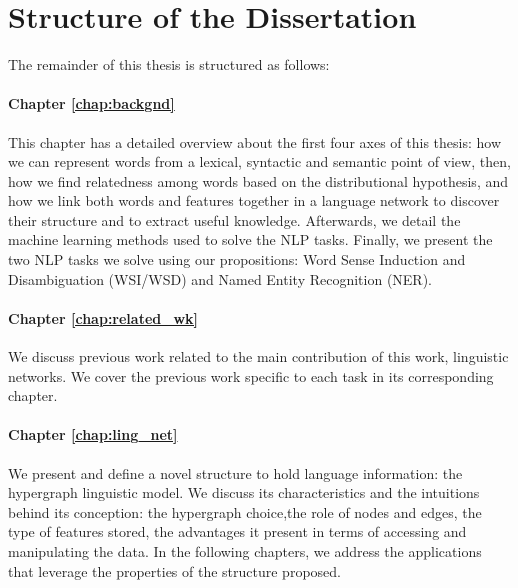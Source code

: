 

\section{Structure of the Dissertation}
The remainder of this thesis is structured as follows:
\paragraph{Chapter \ref{chap:backgnd}} This chapter has a detailed overview about the first four axes of this thesis: how we can represent words from a lexical, syntactic and semantic point of view, then, how we find relatedness among words based on  the distributional hypothesis, and how we link both words and features together in a language network to discover their structure and to extract useful knowledge. 
%
Afterwards, we detail the machine learning methods used to solve the NLP tasks. Finally, we present the two NLP tasks we solve using our propositions: Word Sense Induction and Disambiguation (WSI/WSD) and Named Entity Recognition (NER).
\paragraph{Chapter \ref{chap:related_wk}} We discuss previous work related to the main contribution of this work, linguistic networks. We cover the previous work specific to each task in its corresponding chapter.

\paragraph{Chapter \ref{chap:ling_net}} We present and define a novel structure to hold language information: the hypergraph linguistic model.  We discuss its characteristics and the intuitions behind its conception: the hypergraph choice,the role of nodes and edges, the type of features stored, the advantages it present in terms of accessing and manipulating the data. In the following chapters, we address the applications that leverage the properties of the structure proposed.

